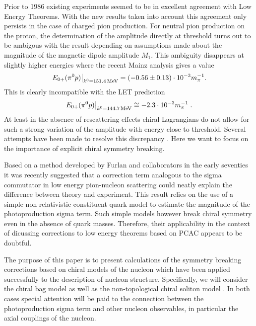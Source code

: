 Prior to 1986 existing experiments
seemed to be in excellent agreement with Low Energy Theorems. With the 
new results taken into account this agreement only persists in the case of
charged pion production. For neutral pion production on the proton, the
determination of the amplitude directly at threshold turns out to be ambigous
\cite{Bec} with the result depending on assumptions made about the magnitude of
the magnetic dipole amplitude $M_{1}$. This ambiguity disappears at slightly  
higher energies where the recent Mainz analysis gives a value
\newcommand{\E}{E_{0+}(\pi^0 p)}
\newcommand{\Ep}{E_{0+}}
\newcommand{\DE}{\Delta E_{0+}}
\newcommand{\su}{\cdot 10^{-3}m_{\pi}^{-1}}
\begin{equation}
\label{Exp}
\left. \E \right|_{k^0 =151.4\,{\rm MeV}} = (-0.56\pm 0.13) \su .
\end{equation}
This is clearly incompatible with the LET prediction \cite{Bae}
\begin{equation}
\label{pre}
\left.\E\right|_{k^0 =144.7\,{\rm MeV}} \cong -2.3 \su \; .
\end{equation}
At least in the absence of rescattering effects  chiral
Lagrangians do not allow for such a strong variation of the amplitude
with energy close to threshold. 
Several attempts have been made to resolve this discrepancy
\cite{Nat,Noz,Yan,Kam}.
Here we want to focus on the importance of explicit chiral symmetry
breaking.
 
Based on a method developed by Furlan and collaborators \cite{Fur}
in the early seventies it was recently suggested \cite{Nat} that a correction
term analogous to the sigma commutator in low energy pion-nucleon scattering
could neatly explain the difference between theory and experiment.
This result relies on the use of a simple non-relativistic
constituent quark model to estimate the magnitude of the photoproduction 
sigma term. Such simple models however break chiral symmetry even in the 
absence of quark masses. Therefore, their applicability in the context of 
dicussing corrections to low energy theorems based on PCAC appears to be
doubtful. 

The purpose of this paper is  to present calculations
of the symmetry breaking corrections based on chiral
models of the nucleon which have been applied successfully to the description
of nucleon structure. Specifically, we will consider the chiral bag model
\cite{Hos} as well as the non-topological chiral soliton model \cite{Bir}. In
both cases special attention will be paid to the connection between the
photoproduction sigma term and other  nucleon observables, in particular the
axial couplings of the nucleon. 

